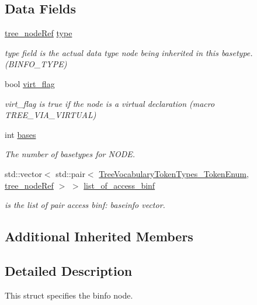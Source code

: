 \subsection*{Data Fields}
\begin{DoxyCompactItemize}
\item 
\hyperlink{tree__node_8hpp_a6ee377554d1c4871ad66a337eaa67fd5}{tree\+\_\+node\+Ref} \hyperlink{structbinfo_aaf491a3232b888e1810a1d8eb7723e58}{type}
\begin{DoxyCompactList}\small\item\em type field is the actual data type node being inherited in this basetype.(B\+I\+N\+F\+O\+\_\+\+T\+Y\+PE) \end{DoxyCompactList}\item 
bool \hyperlink{structbinfo_a7e32edd1e2082ee08e33ac3cfb3e2136}{virt\+\_\+flag}
\begin{DoxyCompactList}\small\item\em virt\+\_\+flag is true if the node is a virtual declaration (macro T\+R\+E\+E\+\_\+\+V\+I\+A\+\_\+\+V\+I\+R\+T\+U\+AL) \end{DoxyCompactList}\item 
int \hyperlink{structbinfo_a2da852932673d31958a4e4fae598a26c}{bases}
\begin{DoxyCompactList}\small\item\em The number of basetypes for N\+O\+DE. \end{DoxyCompactList}\item 
std\+::vector$<$ std\+::pair$<$ \hyperlink{token__interface_8hpp_a14502d0757789149f644966ca931b126}{Tree\+Vocabulary\+Token\+Types\+\_\+\+Token\+Enum}, \hyperlink{tree__node_8hpp_a6ee377554d1c4871ad66a337eaa67fd5}{tree\+\_\+node\+Ref} $>$ $>$ \hyperlink{structbinfo_aaac07e0ce15a2c864f42a79076d0ee07}{list\+\_\+of\+\_\+access\+\_\+binf}
\begin{DoxyCompactList}\small\item\em is the list of pair access binf\+: baseinfo vector. \end{DoxyCompactList}\end{DoxyCompactItemize}
\subsection*{Additional Inherited Members}


\subsection{Detailed Description}
This struct specifies the binfo node. 

